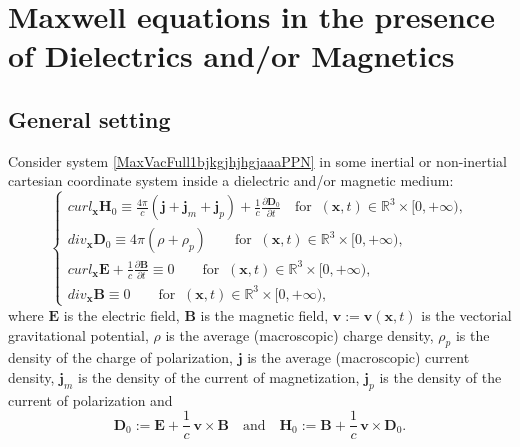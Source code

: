 \documentclass{article}
\theoremstyle{definition}
\theoremstyle{remark}
\renewcommand{\vec}[1]{\mathbf{#1}}
\newcommand{\R}{\mathbb{R}}
\newcommand{\er}{\eqref}
\newcommand{\R}{{\mathbb{R}}}
\newcommand{\er}{\eqref}
\begin{document}
\section{Maxwell equations in the presence of Dielectrics and/or Magnetics}\label{DMPGG}
\subsection{General setting} Consider system
\er{MaxVacFull1bjkgjhjhgjaaaPPN}
in some inertial or non-inertial cartesian coordinate system inside
a dielectric and/or magnetic medium:
\begin{equation}\label{MaxVacFullnnnnGG}
\begin{cases}
curl_{\vec x} \vec H_0\equiv \frac{4\pi}{c}\left(\vec j+\vec
j_m+\vec j_p\right)+
\frac{1}{c}\frac{\partial \vec D_0}{\partial t}\quad\text{for}\;\;(\vec x,t)\in\R^3\times[0,+\infty),\\
div_{\vec x} \vec D_0\equiv 4\pi\left(\rho+\rho_p\right)\quad\quad\text{for}\;\;(\vec x,t)\in\R^3\times[0,+\infty),\\
curl_{\vec x} \vec E+\frac{1}{c}\frac{\partial \vec B}{\partial t}\equiv 0\quad\quad\text{for}\;\;(\vec x,t)\in\R^3\times[0,+\infty),\\
div_{\vec x} \vec B\equiv 0\quad\quad\text{for}\;\;(\vec
x,t)\in\R^3\times[0,+\infty),
\end{cases}
\end{equation}
where $\vec E$ is the electric field, $\vec B$ is the magnetic
field, $\vec v:=\vec v(\vec x,t)$ is the vectorial gravitational
potential, $\rho$ is the average (macroscopic) charge density,
$\rho_p$ is the density of the charge of polarization, $\vec j$ is
the average (macroscopic) current density, $\vec j_m$ is the density
of the current of magnetization, $\vec j_p$ is the density of the
current of polarization and
\begin{equation}\label{MaxVacFullnnnngkggjkklhGG}
\vec D_0:=\vec E+\frac{1}{c}\,\vec v\times \vec
B\quad\text{and}\quad
\vec H_0:=\vec B+\frac{1}{c}\,\vec v\times \vec D_0.
\end{equation}
\end{document}
